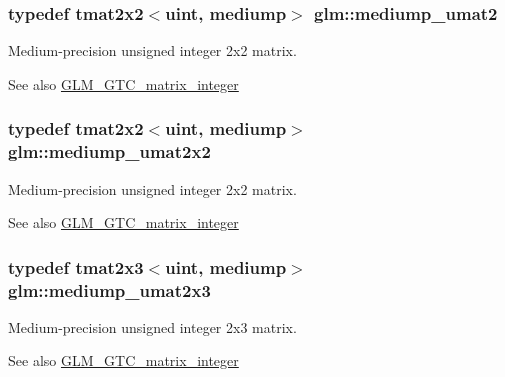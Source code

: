 \subsubsection[{mediump\+\_\+umat2}]{\setlength{\rightskip}{0pt plus 5cm}typedef tmat2x2$<${\bf uint}, mediump$>$ {\bf glm\+::mediump\+\_\+umat2}}\label{group__gtc__matrix__integer_ga85bc35173415dba31bb964c2940feeec}
Medium-\/precision unsigned integer 2x2 matrix. \begin{DoxySeeAlso}{See also}
\hyperlink{group__gtc__matrix__integer}{G\+L\+M\+\_\+\+G\+T\+C\+\_\+matrix\+\_\+integer} 
\end{DoxySeeAlso}
\hypertarget{group__gtc__matrix__integer_gafce8777b8b0d9d7f810853b22de3be1b}{}
\subsubsection[{mediump\+\_\+umat2x2}]{\setlength{\rightskip}{0pt plus 5cm}typedef tmat2x2$<${\bf uint}, mediump$>$ {\bf glm\+::mediump\+\_\+umat2x2}}\label{group__gtc__matrix__integer_gafce8777b8b0d9d7f810853b22de3be1b}
Medium-\/precision unsigned integer 2x2 matrix. \begin{DoxySeeAlso}{See also}
\hyperlink{group__gtc__matrix__integer}{G\+L\+M\+\_\+\+G\+T\+C\+\_\+matrix\+\_\+integer} 
\end{DoxySeeAlso}
\hypertarget{group__gtc__matrix__integer_ga23dfc19249ad27dc4b02615f1d045ba1}{}
\subsubsection[{mediump\+\_\+umat2x3}]{\setlength{\rightskip}{0pt plus 5cm}typedef tmat2x3$<${\bf uint}, mediump$>$ {\bf glm\+::mediump\+\_\+umat2x3}}\label{group__gtc__matrix__integer_ga23dfc19249ad27dc4b02615f1d045ba1}
Medium-\/precision unsigned integer 2x3 matrix. \begin{DoxySeeAlso}{See also}
\hyperlink{group__gtc__matrix__integer}{G\+L\+M\+\_\+\+G\+T\+C\+\_\+matrix\+\_\+integer} 
\end{DoxySeeAlso}
\hypertarget{group__gtc__matrix__integer_ga972445669c6e6652716f3f0b664b94cd}{}
